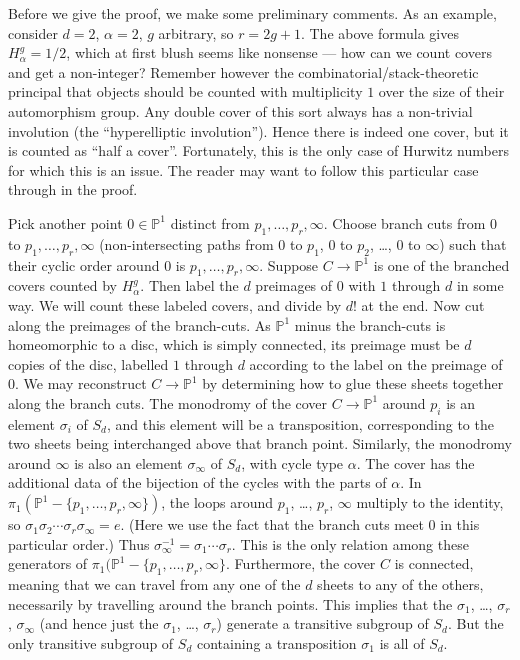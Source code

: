 \documentclass[12pt,letterpaper]{amsart}
\newcommand{\proj}{\mathbb P}
\newcommand{\al}{\alpha}
\newcommand{\si}{\sigma}
\begin{document}
{Before we give the proof, we make some preliminary comments.  As an
example, consider $d=2$, $\al=2$, $g$ arbitrary, so $r=2g+1$.  The
above formula gives $H^g_{\al} = 1/2$, which at first blush seems like
nonsense --- how can we count covers and get a non-integer?  Remember
however the combinatorial/stack-theoretic principal that objects
should be counted with multiplicity  $1$ over the size of
their automorphism group.  Any double cover of this sort always has a
non-trivial involution (the ``hyperelliptic involution'').  Hence
there is indeed one cover, but it is counted as ``half a cover''.
Fortunately, this is the only case of Hurwitz numbers for which this
is an issue.  The reader may want to follow this particular case
through in the proof.


Pick another point $0 \in \proj^1$ distinct from $p_1, \dots,
p_r, \infty$.  Choose branch cuts from $0$ to $p_1, \dots, p_r,
\infty$ (non-intersecting paths from $0$ to $p_1$, $0$ to $p_2$, \dots, $0$
to $\infty$) such that their cyclic order around $0$ is $p_1, \dots,
p_r, \infty$.  Suppose $C \rightarrow \proj^1$ is one of the branched
covers counted by $H^g_{\al}$.  Then label the $d$ preimages of $0$ with  $1$
through $d$ in some way.  We will count these labeled covers, and
divide by $d!$ at the end.  Now cut along the preimages of the
branch-cuts.  As $\proj^1$ minus the branch-cuts is homeomorphic to a
disc, which is simply connected, its preimage must be $d$ copies of
the disc, labelled $1$ through $d$ according to the label on the
preimage of $0$.  We may reconstruct $C \rightarrow \proj^1$ by
determining how to glue these sheets together along the branch cuts.
The monodromy of the cover $C \rightarrow \proj^1$ around $p_i$ is an
element $\si_i$ of $S_d$, and this element will be a transposition,
corresponding to the two sheets being interchanged above that branch
point.  Similarly, the monodromy around $\infty$ is also an element
$\si_{\infty}$ of $S_d$, with cycle type $\al$.  The cover has the
additional data of the bijection of the cycles with the parts of
$\al$. 
 In $\pi_1( \proj^1 - \{ p_1, \dots, p_r, \infty \})$, the loops around $p_1$, \dots, $p_r$, $\infty$ multiply
to the identity, so $\si_1 \si_2 \cdots \si_r \si_{\infty} = e$.
(Here we use the fact that the branch cuts meet $0$ in this particular order.)
Thus $\si_{\infty}^{-1} = \si_1 \cdots  \si_r$.  This is the only
relation among these generators of $\pi_1(\proj^1 - \{ p_1, \dots, p_r, \infty \}$.
Furthermore,
the cover $C$ is connected, meaning that we can travel from any one of the $d$
sheets to any of the others, necessarily by travelling around the branch points.
This implies that the $\si_1$, \dots, $\si_r$, $\si_{\infty}$ (and hence
just the $\si_1$, \dots, $\si_r$) generate a transitive subgroup of $S_d$.
But the only transitive subgroup of $S_d$ containing a transposition $\si_1$
is all of $S_d$.

}
\end{document}
